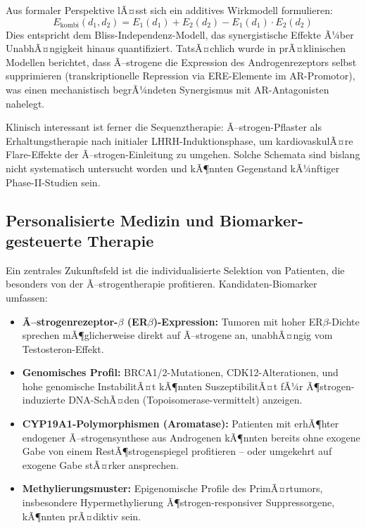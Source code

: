 ﻿\documentclass[a4paper,12pt]{article}
\theoremstyle{definition}
\begin{document}
Aus formaler Perspektive lÃ¤sst sich ein additives Wirkmodell formulieren:
\begin{equation}
  E_{\mathrm{kombi}}(d_1, d_2) = E_1(d_1) + E_2(d_2) - E_1(d_1) \cdot E_2(d_2)
\end{equation}
Dies entspricht dem Bliss-Independenz-Modell, das synergistische Effekte Ã¼ber UnabhÃ¤ngig\-keit hinaus quantifiziert.
TatsÃ¤chlich wurde in prÃ¤klinischen Modellen berichtet, dass Ã–strogene die Expression des Androgenrezeptors selbst supprimieren (transkriptionelle Repression via ERE-Elemente im AR-Promotor), was einen mechanistisch begrÃ¼ndeten Synergismus mit AR-Antagonisten nahelegt.

Klinisch interessant ist ferner die Sequenztherapie: Ã–strogen-Pflaster als Erhaltungstherapie nach initialer LHRH-Induktionsphase, um kardiovaskulÃ¤re Flare-Effekte der Ã–strogen-Einleitung zu umgehen.
Solche Schemata sind bislang nicht systematisch untersucht worden und kÃ¶nnten Gegenstand kÃ¼nftiger Phase-II-Studien sein.

\subsection{Personalisierte Medizin und Biomarker-gesteuerte Therapie}

Ein zentrales Zukunftsfeld ist die individualisierte Selektion von Patienten, die besonders von der Ã–strogentherapie profitieren.
Kandidaten-Biomarker umfassen:
\begin{itemize}
  \item \textbf{Ã–strogenrezeptor-$\beta$ (ER$\beta$)-Expression:} Tumoren mit hoher ER$\beta$-Dichte sprechen mÃ¶glicherweise direkt auf Ã–strogene an, unabhÃ¤ngig vom Testosteron-Effekt.
  \item \textbf{Genomisches Profil:} BRCA1/2-Mutationen, CDK12-Alterationen, und hohe genomische InstabilitÃ¤t kÃ¶nnten SuszeptibilitÃ¤t fÃ¼r Ã¶strogen-induzierte DNA-SchÃ¤den (Topoisomerase-vermittelt) anzeigen.
  \item \textbf{CYP19A1-Polymorphismen (Aromatase):} Patienten mit erhÃ¶hter endogener Ã–strogensynthese aus Androgenen kÃ¶nnten bereits ohne exogene Gabe von einem RestÃ¶strogenspiegel profitieren -- oder umgekehrt auf exogene Gabe stÃ¤rker ansprechen.
  \item \textbf{Methylierungsmuster:} Epigenomische Profile des PrimÃ¤rtumors, insbesondere Hypermethylierung Ã¶strogen-responsiver Suppressorgene, kÃ¶nnten prÃ¤diktiv sein.
\end{itemize}
\end{document}

